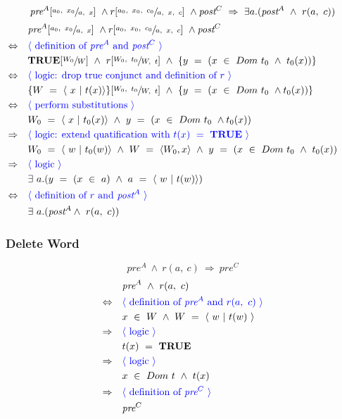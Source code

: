 \documentclass[a4paper, fleqn]{article}
\newcommand{\reason}[1]{\text{\textcolor{blue}{$\langle$ #1 $\rangle$}}}
\begin{document}
$$\textit{pre}^A[\sfrac{a_0,\ x_0}{a,\ x}]\ \land r[\sfrac{a_0,\ x_0,\ c_0}{a,\ x,\ c}]\ \land \textit{post}^{C}\ \Rightarrow\ \exists a.(\textit{post}^A\ \land\ r(a,\ c))$$
\begin{align*}
		&\quad\textit{pre}^A[\sfrac{a_0,\ x_0}{a,\ x}]\ \land r[\sfrac{a_0,\ x_0,\ c_0}{a,\ x,\ c}]\ \land \textit{post}^{C} \\
		\Leftrightarrow&\quad \reason{definition of $\textit{pre}^A$ and $\textit{post}^C$} \\
		&\quad \textbf{TRUE}[\sfrac{W_0}{W}]\ \land\ r[\sfrac{W_0,\ t_0}{W,\ t}]\ \land\ \{y\ =\ (x\ \in\ Dom\ t_0\ \land\ t_0(x))\}\\
		\Leftrightarrow&\quad\reason{logic: drop true conjunct and definition of $r$} \\ 
		&\quad\{W\ =\ \langle\ x\ |\ t(x)\rangle\}[\sfrac{W_0,\ t_0}{W,\ t}]\ \land\ \{y\ =\ (x\ \in\ Dom\ t_0\ \land t_0(x))\} &&\\
		\Leftrightarrow&\quad\reason{perform substitutions} \\
		&\quad W_0\ =\ \langle\ x\ |\ t_0(x)\rangle\ \land\ y\ =\ (x\ \in\ Dom\ t_0\ \land t_0(x)) \\
		\Rightarrow&\quad\reason{logic: extend quatification with $t(x)\ =\ \textbf{TRUE}$} \\
		&\quad W_0\ =\ \langle\ w\ |\ t_0(w)\rangle\ \land\ W\ =\ \langle W_0, x\rangle\ \land\ y\ =\ (x\ \in\ Dom\ t_0\ \land\ t_0(x))\\
		\Rightarrow&\quad\reason{logic} \\
		&\quad\exists\ a.(y\ =\ (x\ \in\ a)\ \land\ a\ =\ \langle\ w\ |\ t(w)\rangle) \\
		\Leftrightarrow&\quad\reason{definition of $r$ and $\textit{post}^A$}\\
		&\quad\exists\ a.(\textit{post}^A \land\ r(a,\ c))
\end{align*}

\subsubsection{Delete Word}
 $$\textit{pre}^A\ \land\ r(a,\ c)\ \Rightarrow\ \textit{pre}^C$$
 \begin{align*}
		 &\quad\textit{pre}^A\ \land\ r(a,\ c) \\
		 \Leftrightarrow&\quad \reason{definition of $\textit{pre}^A$ and $r(a,\ c)$} \\
		 &\quad x\ \in\ W\ \land\ W\ =\ \langle\ w\ |\ t(w)\ \rangle \\
		 \Rightarrow&\quad\reason{logic} \\
		 &\quad t(x)\ =\ \textbf{TRUE} \\
		 \Rightarrow&\quad\reason{logic} \\
		 &\quad x\ \in\ Dom\ t\ \land\ t(x) \\
		 \Rightarrow&\quad\reason{definition of $\textit{pre}^C$} \\
		 &\quad \textit{pre}^C
 \end{align*}
\end{document}

